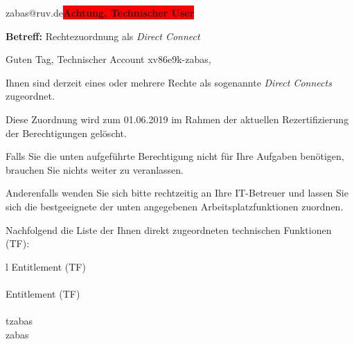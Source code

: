 \documentclass[a4paper,landscape,12pt]{letter}
\begin{document}
\begin{letter}{zabas@ruv.de\space\space\space\space\space\space\space\space\space\bfseries\colorbox{red}{Achtung, Technischer User}\hfill \break}
\begin{normalsize}
	\opening{\textbf{Betreff:} Rechtezuordnung als \emph{Direct Connect}}
	\begin{normalsize} \hfill
	\end{normalsize}

	\begin{normalsize}
		Guten Tag, 
	Technischer Account xv86e9k-zabas, \hfill \break
	\end{normalsize}
	\end{normalsize}
	
\begin{normalsize}
	Ihnen sind derzeit eines oder mehrere Rechte als sogenannte \emph{Direct Connects} zugeordnet.
	
	Diese Zuordnung wird zum 01.06.2019 im Rahmen der aktuellen Rezertifizierung der Berechtigungen gelöscht.
	
	Falls Sie die unten aufgeführte Berechtigung nicht für Ihre Aufgaben benötigen, 
	brauchen Sie nichts weiter zu veranlassen.
	
	Anderenfalls wenden Sie sich bitte rechtzeitig an Ihre IT-Betreuer 
	und lassen Sie sich die bestgeeignete der unten angegebenen Arbeitsplatzfunktionen zuordnen.
	\end{normalsize}
	
\begin{normalsize}
	Nachfolgend die Liste der Ihnen direkt zugeordneten technischen Funktionen (TF):

	\begin{longtable}{l}
		Entitlement (TF) \\ \hline
		\endfirsthead
		\\\hline
		Entitlement (TF) \\ \hline
		\endhead %
		\multicolumn{1}{r@{}}{Fortsetzung \ldots}\\
		\endfoot
		\hline
		\endlastfoot
	tzabas\\zabas\\
	\end{longtable}
	\end{normalsize}
	

\end{letter}
\end{document}
